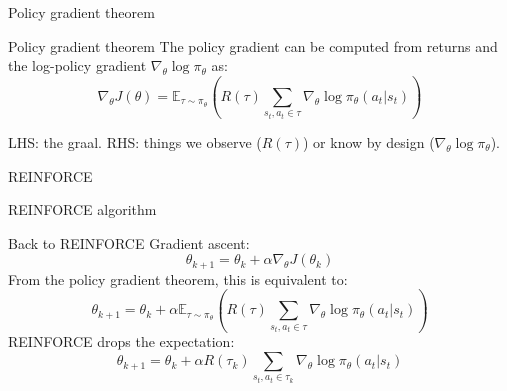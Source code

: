 \documentclass[10pt, aspectratio=1610]{beamer}
\begin{document}
\begin{frame}{Policy gradient theorem}
    \begin{block}{Policy gradient theorem}
        The policy gradient can be computed from returns and the log-policy gradient $\nabla_\theta \log \pi_\theta$ as:
        \begin{equation*}
            \nabla_\theta J(\theta) = \mathbb{E}_{\tau \sim \pi_\theta} \left(
            R(\tau)
            \sum_{s_t, a_t \in \tau} \nabla_\theta \log \pi_\theta(a_t | s_t)
            \right)
        \end{equation*}
    \end{block}
    LHS: the graal. RHS: things we observe ($R(\tau)$) or know by design ($\nabla_\theta \log \pi_\theta$).
\end{frame}

\begin{frame}{REINFORCE}
    \begin{block}{REINFORCE algorithm~\cite{sutton2018}}
        \centering
    \end{block}
\end{frame}

\begin{frame}{Back to REINFORCE}
    Gradient ascent:
    $$
    \theta_{k+1} = \theta_k + \alpha \nabla_\theta J(\theta_k)
    $$
    From the policy gradient theorem, this is equivalent to:
    $$
    \theta_{k+1} = \theta_k + \alpha \mathbb{E}_{\tau \sim \pi_\theta} \left(
            R(\tau)
            \sum_{s_t, a_t \in \tau} \nabla_\theta \log \pi_\theta(a_t | s_t)
            \right)
    $$
    REINFORCE drops the expectation:
    $$
    \theta_{k+1} = \theta_k + \alpha R(\tau_k) \sum_{s_t, a_t \in \tau_k} \nabla_\theta \log \pi_\theta(a_t | s_t)
    $$
\end{frame}
\end{document}
